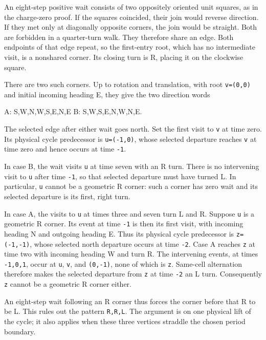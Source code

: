 \documentclass[11pt,letterpaper]{article}
\theoremstyle{plain}
\theoremstyle{definition}
\begin{document}
\begin{NoHyper}
An eight-step positive wait consists of two oppositely oriented unit squares, as in the charge-zero proof. If the squares coincided, their join would reverse direction. If they met only at diagonally opposite corners, the join would be straight. Both are forbidden in a quarter-turn walk. They therefore share an edge. Both endpoints of that edge repeat, so the first-entry root, which has no intermediate visit, is a nonshared corner. Its closing turn is R, placing it on the clockwise square.

There are two such corners. Up to rotation and translation, with root \texttt{v=(0,0)} and initial incoming heading E, they give the two direction words

\begin{codeblock}
A: S,W,N,W,S,E,N,E
B: S,W,S,E,N,W,N,E.
\end{codeblock}

The selected edge after either wait goes north. Set the first visit to \texttt{v} at time zero. Its physical cycle predecessor is \texttt{u=(-1,0)}, whose selected departure reaches \texttt{v} at time zero and hence occurs at time \texttt{-1}.

In case B, the wait visits \texttt{u} at time seven with an R turn. There is no intervening visit to \texttt{u} after time \texttt{-1}, so that selected departure must have turned L. In particular, \texttt{u} cannot be a geometric R corner: such a corner has zero wait and its selected departure is its first, right turn.

In case A, the visits to \texttt{u} at times three and seven turn L and R. Suppose \texttt{u} is a geometric R corner. Its event at time \texttt{-1} is then its first visit, with incoming heading N and outgoing heading E. Thus its physical cycle predecessor is \texttt{z=(-1,-1)}, whose selected north departure occurs at time \texttt{-2}. Case A reaches \texttt{z} at time two with incoming heading W and turn R. The intervening events, at times \texttt{-1,0,1}, occur at \texttt{u}, \texttt{v}, and \texttt{(0,-1)}, none of which is \texttt{z}. Same-cell alternation therefore makes the selected departure from \texttt{z} at time \texttt{-2} an L turn. Consequently \texttt{z} cannot be a geometric R corner either.

An eight-step wait following an R corner thus forces the corner before that R to be L. This rules out the pattern \texttt{R,R,L}. The argument is on one physical lift of the cycle; it also applies when these three vertices straddle the chosen period boundary.


\end{NoHyper}
\end{document}
